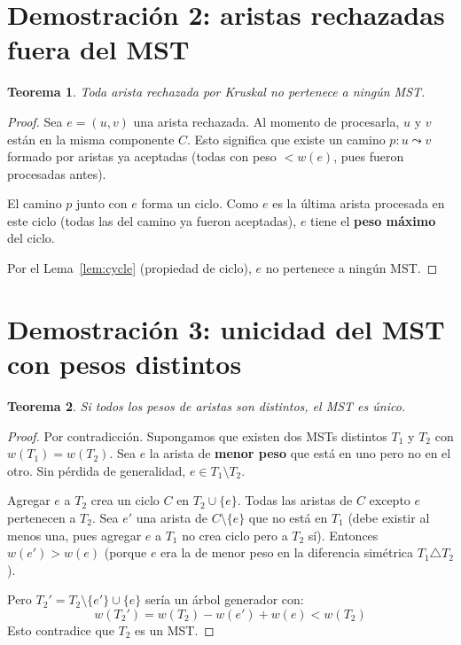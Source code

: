 \documentclass[11pt, letterpaper]{article}
\theoremstyle{definition}
\theoremstyle{plain}
\newtheorem{theorem}{Teorema}[section]
\theoremstyle{remark}
\begin{document}
\section{Demostración 2: aristas rechazadas fuera del MST}

\begin{theorem}\label{thm:rejected}
Toda arista rechazada por Kruskal no pertenece a ningún MST.
\end{theorem}

\begin{proof}
Sea $e = (u, v)$ una arista rechazada. Al momento de procesarla,
$u$ y $v$ están en la misma componente $C$. Esto significa que
existe un camino $p: u \leadsto v$ formado por aristas ya aceptadas
(todas con peso $< w(e)$, pues fueron procesadas antes).

El camino $p$ junto con $e$ forma un ciclo. Como $e$ es la última
arista procesada en este ciclo (todas las del camino ya fueron
aceptadas), $e$ tiene el \textbf{peso máximo} del ciclo.

Por el Lema~\ref{lem:cycle} (propiedad de ciclo), $e$ no pertenece
a ningún MST.
\end{proof}

\section{Demostración 3: unicidad del MST con pesos distintos}

\begin{theorem}\label{thm:unique}
Si todos los pesos de aristas son distintos, el MST es único.
\end{theorem}

\begin{proof}
Por contradicción. Supongamos que existen dos MSTs distintos $T_1$
y $T_2$ con $w(T_1) = w(T_2)$. Sea $e$ la arista de
\textbf{menor peso} que está en uno pero no en el otro. Sin
pérdida de generalidad, $e \in T_1 \setminus T_2$.

Agregar $e$ a $T_2$ crea un ciclo $C$ en $T_2 \cup \{e\}$. Todas
las aristas de $C$ excepto $e$ pertenecen a $T_2$. Sea $e'$ una
arista de $C \setminus \{e\}$ que no está en $T_1$ (debe existir al
menos una, pues agregar $e$ a $T_1$ no crea ciclo pero a $T_2$ sí).
Entonces $w(e') > w(e)$ (porque $e$ era la de menor peso en la
diferencia simétrica $T_1 \triangle T_2$).

Pero $T_2' = T_2 \setminus \{e'\} \cup \{e\}$ sería un árbol
generador con:
\[
  w(T_2') = w(T_2) - w(e') + w(e) < w(T_2)
\]
Esto contradice que $T_2$ es un MST.
\end{proof}
\end{document}
